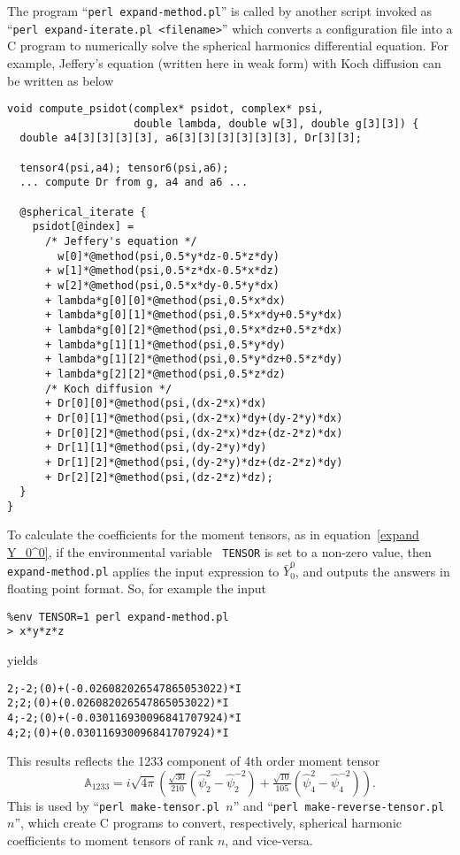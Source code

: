 \documentclass{amsart}
\begin{document}
The program ``{\tt perl expand-method.pl}'' is called by another
script invoked as ``{\tt perl expand-iterate.pl <filename>}'' which
converts a configuration file into a C program to numerically solve
the spherical harmonics differential equation. For example,
Jeffery's equation (written here in weak form) with Koch diffusion
can be written as below
\begin{verbatim}
void compute_psidot(complex* psidot, complex* psi,
                    double lambda, double w[3], double g[3][3]) {
  double a4[3][3][3][3], a6[3][3][3][3][3][3], Dr[3][3];

  tensor4(psi,a4); tensor6(psi,a6);
  ... compute Dr from g, a4 and a6 ...

  @spherical_iterate {
    psidot[@index] =
      /* Jeffery's equation */
        w[0]*@method(psi,0.5*y*dz-0.5*z*dy)
      + w[1]*@method(psi,0.5*z*dx-0.5*x*dz)
      + w[2]*@method(psi,0.5*x*dy-0.5*y*dx)
      + lambda*g[0][0]*@method(psi,0.5*x*dx)
      + lambda*g[0][1]*@method(psi,0.5*x*dy+0.5*y*dx)
      + lambda*g[0][2]*@method(psi,0.5*x*dz+0.5*z*dx)
      + lambda*g[1][1]*@method(psi,0.5*y*dy)
      + lambda*g[1][2]*@method(psi,0.5*y*dz+0.5*z*dy)
      + lambda*g[2][2]*@method(psi,0.5*z*dz)
      /* Koch diffusion */
      + Dr[0][0]*@method(psi,(dx-2*x)*dx)
      + Dr[0][1]*@method(psi,(dx-2*x)*dy+(dy-2*y)*dx)
      + Dr[0][2]*@method(psi,(dx-2*x)*dz+(dz-2*z)*dx)
      + Dr[1][1]*@method(psi,(dy-2*y)*dy)
      + Dr[1][2]*@method(psi,(dy-2*y)*dz+(dz-2*z)*dy)
      + Dr[2][2]*@method(psi,(dz-2*z)*dz);
  }
}
\end{verbatim}

To calculate the coefficients for the moment tensors, as in
equation~\eqref{expand Y_0^0}, if the environmental variable {\tt
TENSOR} is set to a non-zero value, then {\tt expand-method.pl}
applies the input expression to $\bar Y_0^0$, and outputs the
answers in floating point format.  So, for example the input
\begin{verbatim}
%env TENSOR=1 perl expand-method.pl
> x*y*z*z
\end{verbatim}
yields
\begin{verbatim}
2;-2;(0)+(-0.026082026547865053022)*I
2;2;(0)+(0.026082026547865053022)*I
4;-2;(0)+(-0.030116930096841707924)*I
4;2;(0)+(0.030116930096841707924)*I
\end{verbatim}
This results reflects the 1233 component of 4th order moment tensor
\begin{equation*}
\mathbb A_{1233} =
i\sqrt{4\pi}\left(\tfrac{\sqrt{30}}{210}(\hat\psi_2^2-\hat\psi_2^{-2})
+\tfrac{\sqrt{10}}{105}(\hat\psi_4^2-\hat\psi_4^{-2})\right).
\end{equation*}
This is used by ``{\tt perl make-tensor.pl $n$}'' and ``{\tt perl
make-reverse-tensor.pl $n$}'', which create C programs to convert,
respectively, spherical harmonic coefficients to moment tensors of
rank $n$, and vice-versa.



\end{document}
